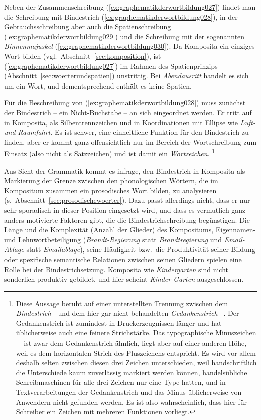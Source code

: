 Neben der Zusammenschreibung (\ref{ex:graphematikderwortbildung027}) findet man die Schreibung mit Bindestrich (\ref{ex:graphematikderwortbildung028}), in der Gebrauchsschreibung aber auch die Spatienschreibung (\ref{ex:graphematikderwortbildung029}) und die Schreibung mit der sogenannten \textit{Binnenmajuskel} (\ref{ex:graphematikderwortbildung030}).
Da Komposita ein einziges Wort bilden (vgl.\ Abschnitt~\ref{sec:komposition}), ist (\ref{ex:graphematikderwortbildung027}) im Rahmen des Spatienprinzips (Abschnitt~\ref{sec:woerterundspatien}) unstrittig.
Bei \textit{Abendausritt} handelt es sich um ein Wort, und dementsprechend enthält es keine Spatien.

Für die Beschreibung von (\ref{ex:graphematikderwortbildung028}) muss zunächst der Bindestrich -- ein Nicht-Buchstabe -- an sich eingeordnet werden.
Er tritt auf in Komposita, als Silbentrennzeichen und in Koordinationen mit Ellipse wie \textit{Luft- und Raumfahrt}.
Es ist schwer, eine einheitliche Funktion für den Bindestrich zu finden, aber er kommt ganz offensichtlich nur im Bereich der Wortschreibung zum Einsatz (also nicht als Satzzeichen) und ist damit ein \textit{Wortzeichen}.%
\footnote{Diese Aussage beruht auf einer unterstellten Trennung zwischen dem \textit{Bindestrich} - und dem hier gar nicht behandelten \textit{Gedankenstrich} --.
Der Gedankenstrich ist zumindest in Druckerzeugnissen länger und hat üblicherweise auch eine feinere Strichstärke.
Das typographische Minuszeichen $-$ ist zwar dem Gedankenstrich ähnlich, liegt aber auf einer anderen Höhe, weil es dem horizontalen Strich des Pluszeichens entspricht.
Es wird vor allem deshalb selten zwischen diesen drei Zeichen unterschieden, weil handschriftlich die Unterschiede kaum zuverlässig markiert werden können, handelsübliche Schreibmaschinen für alle drei Zeichen nur eine Type hatten, und in Textverarbeitungen der Gedankenstrich und das Minus üblicherweise von Anwendern nicht gefunden werden.
Es ist also wahrscheinlich, dass hier für Schreiber ein Zeichen mit mehreren Funktionen vorliegt.}


Aus Sicht der Grammatik kommt es infrage, den Bindestrich in Komposita als Markierung der Grenze zwischen den phonologischen Wörtern, die im Kompositum zusammen ein prosodisches Wort bilden, zu analysieren (s.\ Abschnitt~\ref{sec:prosodischewoerter}).
Dazu passt allerdings nicht, dass er nur sehr sporadisch in dieser Position eingesetzt wird, und dass es vermutlich ganz anders motivierte Faktoren gibt, die die Bindestrichschreibung begünstigen.
Die Länge und die Komplexität (Anzahl der Glieder) des Kompositums, Eigennamen- und Lehnwortbeteiligung (\textit{Brandt-Regierung} statt \textit{Brandtregierung} und \textit{Email-Ablage} statt \textit{Emailablage}), seine Häufigkeit bzw.\ die Produktivität seiner Bildung oder spezifische semantische Relationen zwischen seinen Gliedern spielen eine Rolle bei der Bindestrichsetzung.
Komposita wie \textit{Kindergarten} sind \zB nicht sonderlich produktiv gebildet, und hier scheint \textit{Kinder-Garten} ausgeschlossen.

